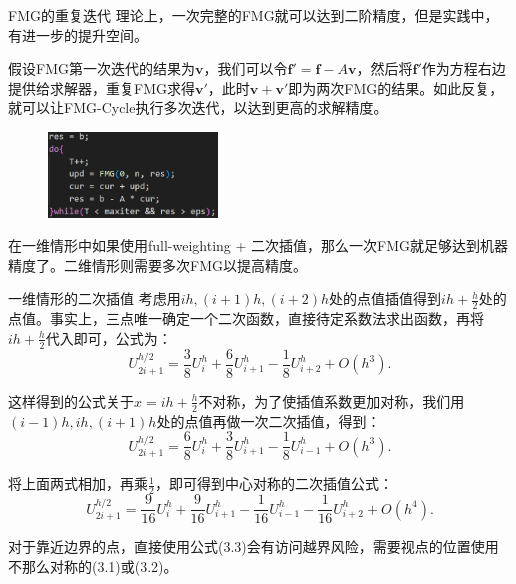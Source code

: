 \documentclass[9pt]{beamer}
\begin{document}
\begin{frame}{FMG的重复迭代}
理论上，一次完整的FMG就可以达到二阶精度，但是实践中，有进一步的提升空间。
\vspace{1em}\pause

假设FMG第一次迭代的结果为$\mathbf{v}$，我们可以令$\mathbf{f}'=\mathbf{f}-A\mathbf{v}$，然后将$\mathbf{f'}$作为方程右边提供给求解器，重复FMG求得$\mathbf{v}'$，此时$\mathbf{v}+\mathbf{v}'$即为两次FMG的结果。如此反复，就可以让FMG-Cycle执行多次迭代，以达到更高的求解精度。
\begin{figure}[H]
  \centering
  \includegraphics[width=0.4\textwidth]{pic/solve.png}
\end{figure}

\vspace{1em}\pause

在一维情形中如果使用full-weighting + 二次插值，那么一次FMG就足够达到机器精度了。二维情形则需要多次FMG以提高精度。
\end{frame}

\begin{frame}{一维情形的二次插值}
考虑用$ih,(i+1)h,(i+2)h$处的点值插值得到$ih+\frac{h}{2}$处的点值。事实上，三点唯一确定一个二次函数，直接待定系数法求出函数，再将$ih+\frac{h}{2}$代入即可，公式为：
\begin{equation}
  U^{h/2}_{2i+1} = \frac{3}{8}U^h_{i} + \frac{6}{8}U^h_{i+1} - \frac{1}{8}U^h_{i+2} + O(h^3).
\end{equation}

\pause
这样得到的公式关于$x=ih+\frac{h}{2}$不对称，为了使插值系数更加对称，我们用$(i-1)h,ih,(i+1)h$处的点值再做一次二次插值，得到：
\begin{equation}
  U^{h/2}_{2i+1} = \frac{6}{8}U^h_{i} + \frac{3}{8}U^h_{i+1} - \frac{1}{8}U^h_{i-1} + O(h^3).
\end{equation}

\pause
将上面两式相加，再乘$\frac{1}{2}$，即可得到中心对称的二次插值公式：
\begin{equation}
  U^{h/2}_{2i+1} = \frac{9}{16}U^h_{i} + \frac{9}{16}U^h_{i+1} - \frac{1}{16}U^h_{i-1} - \frac{1}{16}U^h_{i+2} + O(h^4).
\end{equation}

\pause
对于靠近边界的点，直接使用公式(3.3)会有访问越界风险，需要视点的位置使用不那么对称的(3.1)或(3.2)。
\end{frame}
\end{document}

